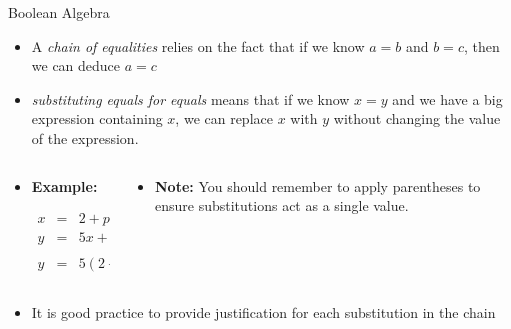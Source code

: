 \documentclass[11pt,t,pdf,xcolor=svgnames,aspectratio=169]{beamer}
\providecommand{\tightlist}{%
  \setlength{\itemsep}{5pt}\setlength{\parskip}{0pt}}
\begin{document}
\begin{frame}{Boolean Algebra}
\protect\hypertarget{boolean-algebra-1}{}
\begin{itemize}
\item
  A \emph{chain of equalities} relies on the fact that if we know
  \(a = b\) and \(b = c\), then we can deduce \(a = c\)
\item
  \emph{substituting equals for equals} means that if we know \(x = y\)
  and we have a big expression containing \(x\), we can replace \(x\)
  with \(y\) without changing the value of the expression.
\end{itemize}

\begin{columns}[T]
\begin{column}{0.48\textwidth}
\begin{itemize}
\item
  \textbf{Example:}

  \(\begin{array}{rcl} x & = & 2 + p \\ y & = & 5x + 3 \\ \\ y & = & 5(2 + p) + 3 \end{array}\)
\end{itemize}
\end{column}

\begin{column}{0.48\textwidth}
\begin{itemize}
\tightlist
\item
  \textbf{Note:} You should remember to apply parentheses to ensure
  substitutions act as a single value.
\end{itemize}
\end{column}
\end{columns}

\begin{itemize}
\tightlist
\item
  It is good practice to provide justification for each substitution in
  the chain
\end{itemize}
\end{frame}
\end{document}
